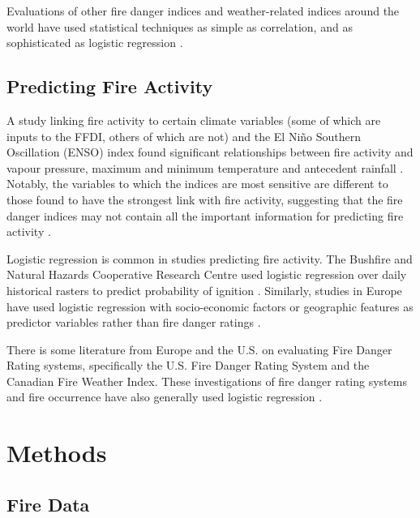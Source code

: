 \documentclass[11pt,a4paper]{article}
\begin{document}
Evaluations of other fire danger indices and weather-related indices around the world have used statistical techniques as simple as correlation, and as sophisticated as logistic regression \citep{andrews03,harris14}.


\subsection{Predicting Fire Activity}

A study linking fire activity to certain climate variables (some of which are inputs to the FFDI, others of which are not) and the El Niño Southern Oscillation (ENSO) index found significant relationships between fire activity and vapour pressure, maximum and minimum temperature and antecedent rainfall \citep{harris14}. Notably, the variables to which the indices are most sensitive are different to those found to have the strongest link with fire activity, suggesting that the fire danger indices may not contain all the important information for predicting fire activity \citep{harris14}.

Logistic regression is common in studies predicting fire activity. The Bushfire and Natural Hazards Cooperative Research Centre used logistic regression over daily historical rasters to predict probability of ignition \citep{Read2015-hn}. Similarly, studies in Europe have used logistic regression with socio-economic factors or geographic features as predictor variables rather than fire danger ratings \citep{del11, zhang13}.

There is some literature from Europe and the U.S. on evaluating Fire Danger Rating systems, specifically the U.S. Fire Danger Rating System and the Canadian Fire Weather Index.  These investigations of fire danger rating systems and fire occurrence have also  generally used logistic regression \citep{andrews03, padilla11}.

\section{Methods}


\subsection{Fire Data}
\end{document}
